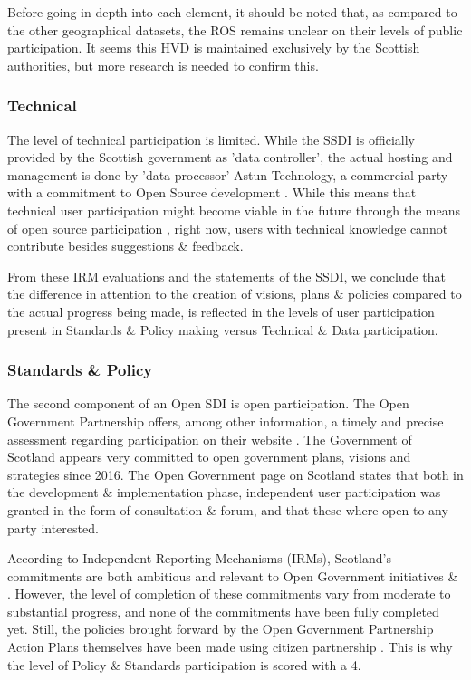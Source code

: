 Before going in-depth into each element, it should be noted that, as compared to the other geographical datasets, the ROS remains unclear on their levels of public participation. It seems this HVD is maintained exclusively by the Scottish authorities, but more research is needed to confirm this. 

\subsubsection{Technical}
The level of technical participation is limited. While the SSDI is officially provided by the Scottish government as 'data controller', the actual hosting and management is done by 'data processor' Astun Technology, a commercial party with a commitment to Open Source development \citep{ssdi_documentation}. While this means that technical user participation might become viable in the future through the means of open source participation \citep{osi_definition}, right now, users with technical knowledge cannot contribute besides suggestions \& feedback. 

From these IRM evaluations and the statements of the SSDI, we conclude that the difference in attention to the creation of visions, plans \& policies compared to the actual progress being made, is reflected in the levels of user participation present in Standards \& Policy making versus Technical \& Data participation. 

\subsubsection{Standards \& Policy}


The second component of an Open SDI is open participation. The Open Government Partnership offers, among other information, a timely and precise assessment regarding participation on their website \citep{opengovpartnership_mainpage}. The Government of Scotland appears very committed to open government plans, visions and strategies since 2016. The Open Government page on Scotland states that both in the development \& implementation phase, independent user participation was granted in the form of consultation \& forum, and that these where open to any party interested. 

According to Independent Reporting Mechanisms (IRMs), Scotland's commitments are both ambitious and relevant to Open Government initiatives \&  \citep{opengovpartnership_increasing_participation, opengovpartnership_openpolicymaking}. However, the level of completion of these commitments vary from moderate to substantial progress, and none of the commitments have been fully completed yet. Still, the policies brought forward by the Open Government Partnership Action Plans themselves have been made using citizen partnership \citep{opengovpartnership_action_plan}. This is why the level of Policy \& Standards participation is scored with a 4.

